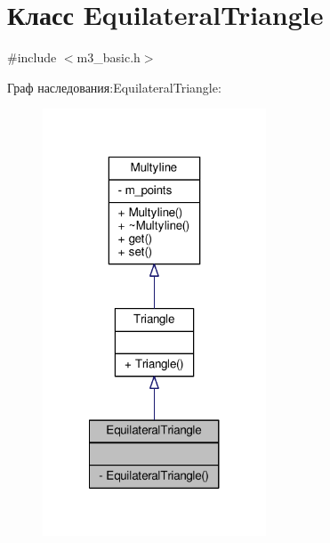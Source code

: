 \hypertarget{class_equilateral_triangle}{\section{Класс Equilateral\-Triangle}
\label{class_equilateral_triangle}
}


{\ttfamily \#include $<$m3\-\_\-basic.\-h$>$}



Граф наследования\-:Equilateral\-Triangle\-:
\nopagebreak
\begin{figure}[H]
\begin{center}
\leavevmode
\includegraphics[width=188pt]{class_equilateral_triangle__inherit__graph}
\end{center}
\end{figure}


